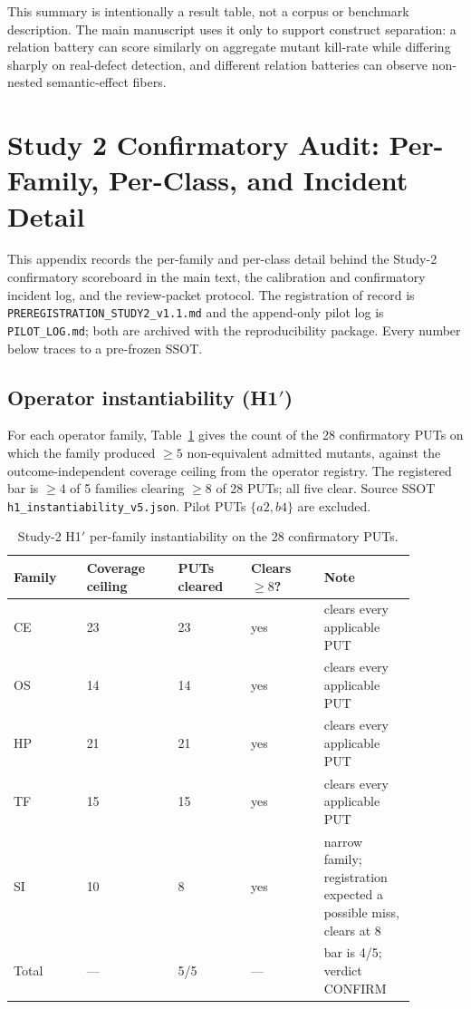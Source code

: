 \documentclass[manuscript,screen,review]{acmart}
\begin{document}
This summary is intentionally a result table, not a corpus or benchmark
description. The main manuscript uses it only to support construct
separation: a relation battery can score similarly on aggregate mutant
kill-rate while differing sharply on real-defect detection, and different
relation batteries can observe non-nested semantic-effect fibers.

\section{Study 2 Confirmatory Audit: Per-Family, Per-Class, and Incident Detail}\label{j.-study2-confirmatory-detail}

This appendix records the per-family and per-class detail behind the
Study-2 confirmatory scoreboard in the main text, the calibration and
confirmatory incident log, and the review-packet protocol. The
registration of record is
\texttt{PREREGISTRATION\_STUDY2\_v1.1.md} and the append-only pilot log is
\texttt{PILOT\_LOG.md}; both are archived with the reproducibility
package. Every number below traces to a pre-frozen SSOT.

\subsection{Operator instantiability (H1\('\))}\label{j.1-h1-instantiability}

For each operator family, Table~\ref{tab:study2-h1} gives the count of
the 28 confirmatory PUTs on which the family produced \(\geq 5\)
non-equivalent admitted mutants, against the outcome-independent coverage
ceiling from the operator registry. The registered bar is \(\geq 4\) of 5
families clearing \(\geq 8\) of 28 PUTs; all five clear. Source SSOT
\texttt{h1\_instantiability\_v5.json}. Pilot PUTs \(\{a2, b4\}\) are
excluded.

{%
\small
\begin{longtable}[]{@{}p{0.16\linewidth}p{0.20\linewidth}p{0.16\linewidth}p{0.16\linewidth}p{0.20\linewidth}@{}}
\caption{Study-2 H1\('\) per-family instantiability on the 28
confirmatory PUTs.}\label{tab:study2-h1}\\
\toprule\noalign{}
Family & Coverage ceiling & PUTs cleared & Clears $\geq 8$? & Note \\
\midrule\noalign{}
\endfirsthead
\endhead
\bottomrule\noalign{}
\endlastfoot
CE & 23 & 23 & yes & clears every applicable PUT \\
OS & 14 & 14 & yes & clears every applicable PUT \\
HP & 21 & 21 & yes & clears every applicable PUT \\
TF & 15 & 15 & yes & clears every applicable PUT \\
SI & 10 & 8 & yes & narrow family; registration expected a possible miss, clears at 8 \\
\midrule
Total & --- & 5/5 & --- & bar is 4/5; verdict CONFIRM \\
\end{longtable}
\normalsize
}
\end{document}
